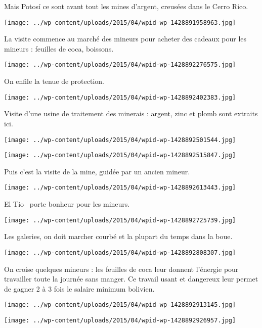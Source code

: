  Mais Potosí ce sont avant tout les mines d'argent, creusées dans le Cerro Rico.
\begin{center} \texttt{[image: ../wp-content/uploads/2015/04/wpid-wp-1428891958963.jpg]} \end{center}

 La visite commence au marché des mineurs pour acheter des cadeaux pour les mineurs : feuilles de coca, boissons.
\begin{center} \texttt{[image: ../wp-content/uploads/2015/04/wpid-wp-1428892276575.jpg]} \end{center}
\vspace{-\topsep}

\pagebreak
 On enfile la tenue de protection. \\
\begin{center} \texttt{[image: ../wp-content/uploads/2015/04/wpid-wp-1428892402383.jpg]} \end{center}

 Visite d'une usine de traitement des minerais : argent, zinc et plomb sont extraits ici. 
\begin{center} \texttt{[image: ../wp-content/uploads/2015/04/wpid-wp-1428892501544.jpg]} \end{center}
\begin{center} \texttt{[image: ../wp-content/uploads/2015/04/wpid-wp-1428892515847.jpg]} \end{center}

 Puis c'est la visite de la mine, guidée par un ancien mineur. 
\begin{center} \texttt{[image: ../wp-content/uploads/2015/04/wpid-wp-1428892613443.jpg]} \end{center}
\vspace{-\topsep}

\pagebreak
 \og El Tio \fg\ porte bonheur pour les mineurs. 
\begin{center} \texttt{[image: ../wp-content/uploads/2015/04/wpid-wp-1428892725739.jpg]} \end{center}

Les galeries, on doit marcher courbé et la plupart du temps dans la boue. 
\begin{center} \texttt{[image: ../wp-content/uploads/2015/04/wpid-wp-1428892808307.jpg]} \end{center}

 On croise quelques mineurs : les feuilles de coca leur donnent l'énergie pour travailler toute la journée sans manger. 
\vfill
 Ce travail usant et dangereux leur permet de gagner 2 à 3 fois le salaire minimum bolivien. 
 \vfill
\begin{center} \texttt{[image: ../wp-content/uploads/2015/04/wpid-wp-1428892913145.jpg]} \end{center}
\vfill
\begin{center} \texttt{[image: ../wp-content/uploads/2015/04/wpid-wp-1428892926957.jpg]} \end{center}
\vspace{-\topsep}
\vspace{-0.75mm}
